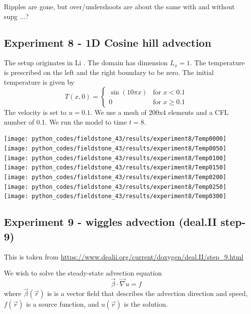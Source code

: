 Ripples are gone, but over/undershoots are about the same with and without supg ...?


\subsection*{Experiment 8 - 1D Cosine hill advection}

The setup originates in Li \cite[ex 5.2]{li06}.
The domain has dimension $L_x=1$. 
The temperature is prescribed on the left and the right boundary to be zero. 
The initial temperature is given by
\[
T(x,0)=
\left\{
\begin{array}{ll}
\sin (10 \pi x) & \textrm{for } x< 0.1 \\
0               & \textrm{for } x\geq 0.1 
\end{array}
\right.
\]
The velocity is set to $u=0.1$.
We use a mesh of 200x4 elements and a CFL number of 0.1. 
We run the model to time $t=8$.


\begin{center}
\texttt{[image: python\_codes/fieldstone\_43/results/experiment8/Temp0000]}
\texttt{[image: python\_codes/fieldstone\_43/results/experiment8/Temp0050]}
\texttt{[image: python\_codes/fieldstone\_43/results/experiment8/Temp0100]}
\texttt{[image: python\_codes/fieldstone\_43/results/experiment8/Temp0150]}\\
\texttt{[image: python\_codes/fieldstone\_43/results/experiment8/Temp0200]}
\texttt{[image: python\_codes/fieldstone\_43/results/experiment8/Temp0250]}
\texttt{[image: python\_codes/fieldstone\_43/results/experiment8/Temp0300]}
\end{center}

\subsection*{Experiment 9 - wiggles advection (deal.II step-9)}

This is taken from \url{https://www.dealii.org/current/doxygen/deal.II/step_9.html}

We wish to solve the steady-state advection equation 
\[
\vec\beta \cdot \vec\nabla u = f
\]
where $\vec\beta(\vec r)$ is  is a vector field that describes the advection direction and speed,
$f(\vec r)$ is a source function, and $u(\vec r)$ is the solution. 

